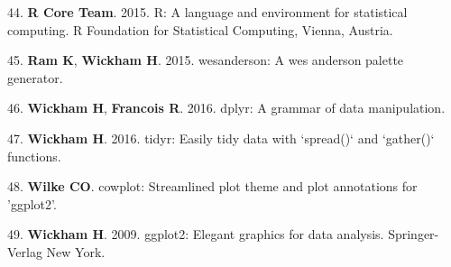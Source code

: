 \documentclass[11pt,]{article}
\begin{document}
\hypertarget{ref-language2015}{}
44. \textbf{R Core Team}. 2015. R: A language and environment for
statistical computing. R Foundation for Statistical Computing, Vienna,
Austria.

\hypertarget{ref-wesanderson}{}
45. \textbf{Ram K}, \textbf{Wickham H}. 2015. wesanderson: A wes
anderson palette generator.

\hypertarget{ref-dplyr}{}
46. \textbf{Wickham H}, \textbf{Francois R}. 2016. dplyr: A grammar of
data manipulation.

\hypertarget{ref-tidyr}{}
47. \textbf{Wickham H}. 2016. tidyr: Easily tidy data with `spread()`
and `gather()` functions.

\hypertarget{ref-cowplot}{}
48. \textbf{Wilke CO}. cowplot: Streamlined plot theme and plot
annotations for 'ggplot2'.

\hypertarget{ref-ggplot2}{}
49. \textbf{Wickham H}. 2009. ggplot2: Elegant graphics for data
analysis. Springer-Verlag New York.
\end{document}
